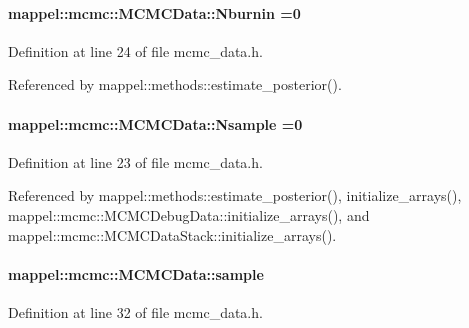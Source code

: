 \paragraph[{\texorpdfstring{Nburnin}{Nburnin}}]{ mappel\+::mcmc\+::\+M\+C\+M\+C\+Data\+::\+Nburnin =0}\hypertarget{structmappel_1_1mcmc_1_1MCMCData_a5aa4a9684f85cc11e448de4d5490a63c}{}\label{structmappel_1_1mcmc_1_1MCMCData_a5aa4a9684f85cc11e448de4d5490a63c}


Definition at line 24 of file mcmc\+\_\+data.\+h.



Referenced by mappel\+::methods\+::estimate\+\_\+posterior().

\paragraph[{\texorpdfstring{Nsample}{Nsample}}]{ mappel\+::mcmc\+::\+M\+C\+M\+C\+Data\+::\+Nsample =0}\hypertarget{structmappel_1_1mcmc_1_1MCMCData_a601995701dceecb6350533f97067c379}{}\label{structmappel_1_1mcmc_1_1MCMCData_a601995701dceecb6350533f97067c379}


Definition at line 23 of file mcmc\+\_\+data.\+h.



Referenced by mappel\+::methods\+::estimate\+\_\+posterior(), initialize\+\_\+arrays(), mappel\+::mcmc\+::\+M\+C\+M\+C\+Debug\+Data\+::initialize\+\_\+arrays(), and mappel\+::mcmc\+::\+M\+C\+M\+C\+Data\+Stack\+::initialize\+\_\+arrays().

\paragraph[{\texorpdfstring{sample}{sample}}]{ mappel\+::mcmc\+::\+M\+C\+M\+C\+Data\+::sample}\hypertarget{structmappel_1_1mcmc_1_1MCMCData_a3e13858482ca8f898684eed95b9bf7f1}{}\label{structmappel_1_1mcmc_1_1MCMCData_a3e13858482ca8f898684eed95b9bf7f1}


Definition at line 32 of file mcmc\+\_\+data.\+h.



